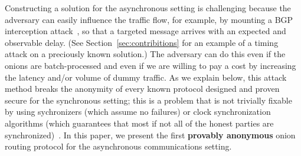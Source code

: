\documentclass[runningheads,a4paper]{llncs}
\begin{document}

Constructing a solution for the asynchronous setting is challenging because the adversary can easily influence the traffic flow, for example, by mounting a BGP interception attack~\cite{SEVL+15}, so that a targeted message arrives with an expected and observable delay. (See Section~\ref{sec:contribitions} for an example of a timing attack on a preciously known solution.) The adversary can do this even if the onions are batch-processed and even if we are willing to pay a cost by increasing the latency and/or volume of dummy traffic. As we explain below, this attack method breaks the anonymity of every known protocol designed and proven secure for the synchronous setting; this is a problem that is not trivially fixable by using sychronizers (which assume no failures) or clock synchronization algorithms (which guarantees that most if not all of the honest parties are synchronized)~\cite{lynch1996distributed}. %
In this paper, we present the first \textbf{provably anonymous} onion routing protocol for the asynchronous communications setting. %




\end{document}
